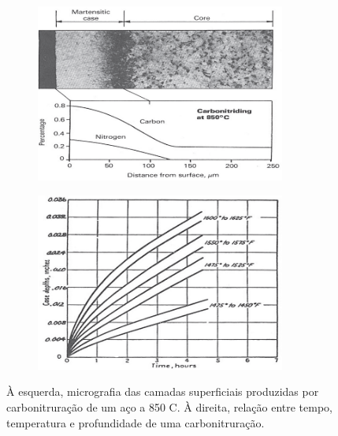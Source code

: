 \begin{figure}[htb]
    \centering
    \begin{subfigure}{.5\textwidth}
        \centering
        \includegraphics[width = 0.9\textwidth]{Figures/Cap2/Carbonitriding_microstructure.png}
        \caption[Micrografia de uma peça tratada por carbonitruração]%
        {}
        \label{fig:Carbonitriding_microstructure}
    \end{subfigure}%
    \begin{subfigure}{.5\textwidth}
        \centering
        \includegraphics[width = 0.9\textwidth]{Figures/Cap2/Carbonitriding_depth.png}
        \caption[Composição de carbono e azoto em relação à profundidade de tratamento]%
        {}
        \label{fig:Carbonitriding_depth}
    \end{subfigure}
    \caption[ ]%
    {À esquerda, micrografia das camadas superficiais produzidas por carbonitruração de um aço a 850 \textdegree C. À direita, relação entre tempo, temperatura e profundidade de uma carbonitruração\cite{Herring2011}.}
\end{figure}
